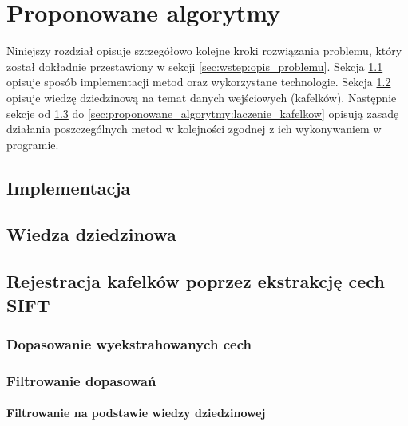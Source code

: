 %
\chapter{Proponowane algorytmy}
\label{sec:proponowane_algorytmy}

Niniejszy rozdział opisuje szczegółowo kolejne kroki rozwiązania problemu, który został dokładnie przestawiony w sekcji \ref{sec:wstep:opis_problemu}. Sekcja \ref{sec:proponowane_algorytmy:implementacja} opisuje sposób implementacji metod oraz wykorzystane technologie. Sekcja \ref{sec:proponowane_algorytmy:wiedza_dziedzinowa} opisuje wiedzę dziedzinową na temat danych wejściowych (kafelków). Następnie sekcje od \ref{sec:proponowane_algorytmy:sift} do \ref{sec:proponowane_algorytmy:laczenie_kafelkow} opisują zasadę działania poszczególnych metod w kolejności zgodnej z ich wykonywaniem w programie.

\section{Implementacja}
\label{sec:proponowane_algorytmy:implementacja}


\section{Wiedza dziedzinowa}
\label{sec:proponowane_algorytmy:wiedza_dziedzinowa}


\section{Rejestracja kafelków poprzez ekstrakcję cech SIFT}
\label{sec:proponowane_algorytmy:sift}

\subsection{Dopasowanie wyekstrahowanych cech}
\label{sec:proponowane_algorytmy:filtrowanie}

\subsection{Filtrowanie dopasowań}
\label{sec:proponowane_algorytmy:filtrowanie}

\subsubsection{Filtrowanie na podstawie wiedzy dziedzinowej}
\label{sec:proponowane_algorytmy:filtrowanie_dziedzinowe}

